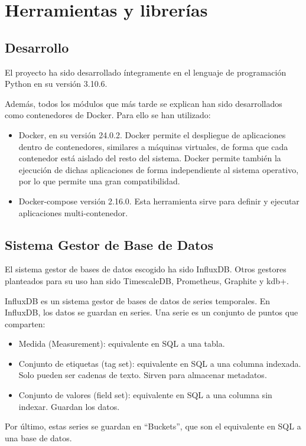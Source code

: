 \section{Herramientas y librerías}

\subsection{Desarrollo}

El proyecto ha sido desarrollado íntegramente en el lenguaje de programación Python en su versión 3.10.6.

Además, todos los módulos que más tarde se explican han sido desarrollados como contenedores de Docker. Para ello 
se han utilizado:
\begin{itemize}
    \item Docker, en su versión 24.0.2. Docker permite el despliegue de aplicaciones dentro de contenedores, similares
        a máquinas virtuales, de forma que cada contenedor está aislado del resto del sistema. Docker permite también
        la ejecución de dichas aplicaciones de forma independiente al sistema operativo, por lo que permite una gran 
        compatibilidad. 
    \item Docker-compose versión 2.16.0. Esta herramienta sirve para definir y ejecutar aplicaciones multi-contenedor.
\end{itemize}

\subsection{Sistema Gestor de Base de Datos}

El sistema gestor de bases de datos escogido ha sido InfluxDB. Otros gestores planteados para su uso han sido
TimescaleDB, Prometheus, Graphite y kdb+.

InfluxDB es un sistema gestor de bases de datos de series temporales. En InfluxDB, los datos se guardan en series. 
Una serie es un conjunto de puntos que comparten:
\begin{itemize}
    \item Medida (Measurement): equivalente en SQL a una tabla.
    \item Conjunto de etiquetas (tag set): equivalente en SQL a una columna indexada. Solo pueden ser cadenas de texto.
        Sirven para almacenar metadatos.
    \item Conjunto de valores (field set): equivalente en SQL a una columna sin indexar. Guardan los datos.
\end{itemize}
Por último, estas series se guardan en ``Buckets'', que son el equivalente en SQL a una base de datos.

